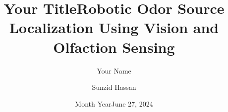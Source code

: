 \documentclass[12pt]{report}
\title{Your Title}
\author{Your Name}
\date{Month Year}
\title{Robotic Odor Source Localization Using Vision and Olfaction Sensing}
\author{Sunzid Hassan}
\date{June 27, 2024}
\renewenvironment{itemize}{%
\vspace{-.15in} %
    \begin{olditemize}%
\setlength{\parsep}{0ex}
\setlength{\topsep}{0ex}
\setlength{\partopsep}{0ex}
      \setlength{\parskip}{0pt}%
      \setlength{\itemsep}{0pt}%
  }%
  {%
    \end{olditemize}%
  }
\numberwithin{equation}{chapter}
\begin{document}
\begin{comment}
\thispagestyle{empty}

\begin{singlespace}


Good advice for feedback from proofreaders in general:
When the format for a certain type of entry, say a section heading,
is marked as ``to be corrected" (long section headings are supposed
to be in inverted pyramid form), it is best to
check the format of {\em all} these entries, as
the format needs to be
consistent overall.


\end{singlespace}


\clearpage

\thispagestyle{empty}


\begin{singlespace}

\centerline{\bf Notes for Proofreading and Format Checking}

\vspace{.1in}


We appreciate the services provided by proofreaders and
format checkers to assure uniformly high quality of documents
produced at Louisiana Tech University.
Because of the differences between mathematical
documents and other documents, we request that the following
be kept in mind.

\begin{itemize}
\item
This document was typeset using Louisiana Tech's approved
\LaTeX \ template. Therefore most formatting
should be a non-issue.

\item
Issues that should not require correction, except
as indicated below.

\vspace{.1in} %

\begin{itemize}
\item
Global margins, order of sections, page numbering,
title page, format of
headings, table of contents, list of figures, list of tables.
(All approved when the template was created.)


\end{comment}
\end{document}
